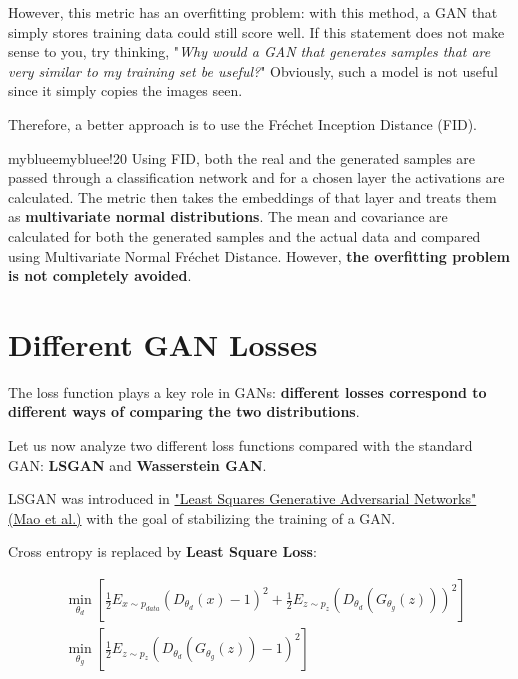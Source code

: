 However, this metric has an overfitting problem: with this method, a GAN that simply stores training data could still score well. If this statement does not make sense to you, try thinking, "\textit{Why would a GAN that generates samples that are very similar to my training set be useful?}" Obviously, such a model is not useful since it simply copies the images seen. 

Therefore, a better approach is to use the Fréchet Inception Distance (FID).

\begin{remark}{mybluee}{mybluee!20}
Using FID, both the real and the generated samples are passed through a classification network and for a chosen layer the activations are calculated. The metric then takes the embeddings of that layer and treats them as \textbf{multivariate normal distributions}. The mean and covariance are calculated for both the generated samples and the actual data and compared using Multivariate Normal Fréchet Distance. However, \textbf{the overfitting problem is not completely avoided}.
\end{remark}

\section{Different GAN Losses}

The loss function plays a key role in GANs: \textbf{different losses correspond to different ways of comparing the two distributions}.

Let us now analyze two different loss functions compared with the standard GAN: \textbf{LSGAN} and \textbf{Wasserstein GAN}.

LSGAN was introduced in \href{https://arxiv.org/pdf/1611.04076}{"Least Squares Generative Adversarial Networks" (Mao et al.)} with the goal of stabilizing the training of a GAN.

Cross entropy is replaced by \textbf{Least Square Loss}:

\vspace{-0.5cm}
{\Large
\begin{equation*}
\begin{aligned}
    &\min_{\theta_{d}} \left[\frac{1}{2}E_{x \sim p_{data}} \left(D_{\theta_{d}}(x) - 1\right)^2 + \frac{1}{2}E_{z \sim p_{z}} \left(D_{\theta_{d}}(G_{\theta_{g}}(z))\right)^2\right] \\
    &\min_{\theta_{g}} \left[\frac{1}{2}E_{z \sim p_{z}} \left(D_{\theta_{d}}(G_{\theta_{g}}(z)) - 1\right)^2\right]
\end{aligned}
\end{equation*}
}

